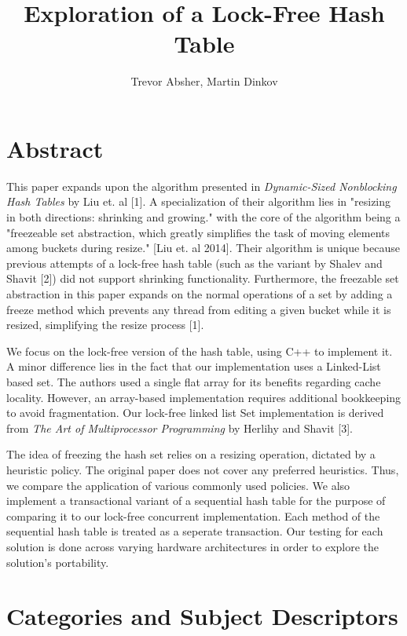 \documentclass[11pt]{article} %
\title{Exploration of a Lock-Free Hash Table}
\author{Trevor Absher, Martin Dinkov}
\begin{document}
\maketitle

\section{Abstract}

This paper expands upon the algorithm presented in \textit{Dynamic-Sized Nonblocking Hash Tables} by Liu et. al [1]. A specialization of their algorithm lies in "resizing in both directions: shrinking and growing." with the core of the algorithm being a "freezeable set abstraction, which greatly simplifies the task of moving elements among buckets during resize." [Liu et. al 2014]. Their algorithm is unique because previous attempts of a lock-free hash table (such as the variant by Shalev and Shavit [2]) did not support shrinking functionality. Furthermore, the freezable set abstraction in this paper expands on the normal operations of a set by adding a freeze method which prevents any thread from editing a given bucket while it is resized, simplifying the resize process [1].

We focus on the lock-free version of the hash table, using C++ to implement it. A minor difference lies in the fact that our implementation uses a Linked-List based set. The authors used a single flat array for its benefits regarding cache locality. However, an array-based implementation requires additional bookkeeping to avoid fragmentation. Our lock-free linked list Set implementation is derived from \textit{The Art of Multiprocessor Programming} by Herlihy and Shavit [3]. 

The idea of freezing the hash set relies on a resizing operation, dictated by a heuristic policy. The original paper does not cover any preferred heuristics. Thus, we compare the application of various commonly used policies. We also implement a transactional variant of a sequential hash table for the purpose of comparing it to our lock-free concurrent implementation. Each method of the sequential hash table is treated as a seperate transaction. Our testing for each solution is done across varying hardware architectures in order to explore the solution's portability.  

\section{Categories and Subject Descriptors}
\end{document}
